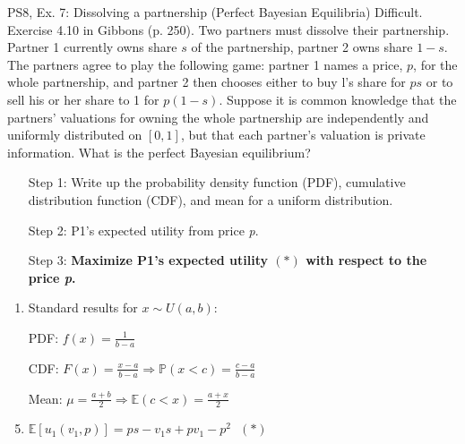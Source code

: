 \begin{frame}{PS8, Ex. 7: Dissolving a partnership (Perfect Bayesian Equilibria)}
    Difficult. Exercise 4.10 in Gibbons (p. 250). Two partners must dissolve their partnership. Partner 1 currently owns share $s$ of the partnership, partner 2 owns share $1-s$. The partners agree to play the following game: partner 1 names a price, $p$, for the whole partnership, and partner 2 then chooses either to buy l's share for $ps$ or to sell his or her share to 1 for $p(1-s)$. Suppose it is common knowledge that the partners' valuations for owning the whole partnership are independently and uniformly distributed on $[0,1]$, but that each partner's valuation is private information. What is the perfect Bayesian equilibrium?\vspace{-11pt}
    \begin{multicols}{2}
      \begin{itemize}
        \item[Step 1:] Write up the probability density function (PDF), cumulative distribution function (CDF), and mean for a uniform distribution.
        \item[Step 2:] P1's expected utility from price \textit{p}.
        \item[Step 3:] \textbf{Maximize P1's expected utility $(*)$ with respect to the price \textit{p}.}
      \end{itemize}\vspace{-8pt}
      \vfill\null\columnbreak
      \begin{enumerate}
        \item Standard results for $x\sim U(a, b):$
        \item[PDF:]  $f(x)=\frac{1}{b-a}$
        \item[CDF:]  $F(x)=\frac{x-a}{b-a}\Rightarrow\mathbb{P}(x<c)=\frac{c-a}{b-a}$
        \item[Mean:] $\mu=\frac{a+b}{2}\Rightarrow\mathbb{E}(c<x)=\frac{a+x}{2}$
        \item $\mathbb{E}[u_1(v_1,p)]=ps-v_1s+pv_1-p^2\ \ \ (*)$
      \end{enumerate}
      \vfill\null
    \end{multicols}
\end{frame}
